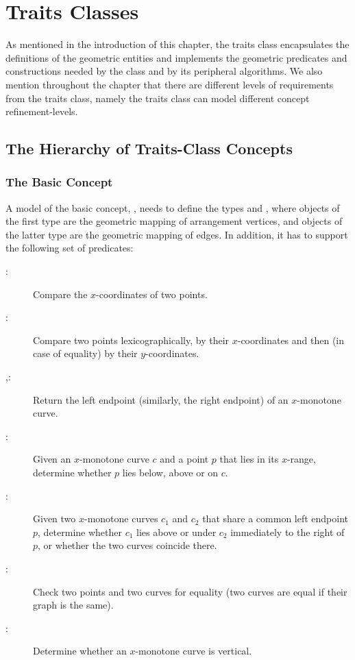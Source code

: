 \section{Traits Classes\label{arr_sec:traits}}

As mentioned in the introduction of this chapter, the traits class
encapsulates the definitions of the geometric entities and
implements the geometric predicates and constructions needed by
the  class and by its peripheral algorithms. We also
mention throughout the chapter that there are different levels of
requirements from the traits class, namely the traits class can model
different concept refinement-levels.

\subsection{The Hierarchy of Traits-Class Concepts
\label{arr_sssec:tr_concepts}}

\subsubsection{The Basic Concept
\label{arr_sssec:tr_basic_concept}}

A model of the basic concept, ,
needs to define the types  and
, where objects of the first type are
the geometric mapping of arrangement vertices, and objects of the
latter type are the geometric mapping of edges. In addition, it has to
support the following set of predicates:
\begin{description}
\item[:] Compare the $x$-coordinates of two points.
\item[:] Compare two points lexicographically, by
  their $x$-coordinates and then (in case of equality) by their
  $y$-coordinates.
\item[,:]
  Return the left endpoint (similarly, the right endpoint) of
  an $x$-monotone curve.
\item[:] Given an $x$-monotone curve $c$ and a
  point $p$ that lies in its $x$-range, determine whether $p$ lies
  below, above or on $c$.
\item[:]
  Given two $x$-monotone curves $c_1$ and $c_2$ that share a common
  left endpoint $p$, determine whether $c_1$ lies above or under $c_2$
  immediately to the right of $p$, or whether the two curves coincide
  there.
\item[:] Check two points and two curves for equality
  (two curves are equal if their graph is the same).
\item[:]
  Determine whether an $x$-monotone curve is vertical.
\end{description}

